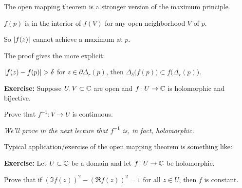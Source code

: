 \documentclass[10pt,aspectratio=169]{beamer}
\begin{document}
\begin{frame}
The open mapping theorem is a stronger version of the maximum
principle.

\medskip
\pause

$f(p)$ is in the interior of $f(V)$ for any open neighborhood $V$ of $p$.

\pause
So $\lvert {f(z)} \rvert$ cannot achieve a maximum at $p$.

\medskip
\pause

The proof gives the more explicit:

\medskip

$\left\lvert {f(z)-f(p)} \right\rvert > \delta$ for $z \in \partial \Delta_r(p)$,
then
$\Delta_{\delta}\bigl(f(p)\bigr) \subset f\bigl(\Delta_r(p)\bigr)$.
\end{frame}

\begin{frame}

\textbf{Exercise:}
Suppose $U,V \subset {\mathbb{C}}$ are open and $f \colon U \to {\mathbb{C}}$ is holomorphic
and bijective.

Prove that $f^{-1} \colon V \to U$ is continuous.

\pause
\emph{We'll prove in the next lecture that $f^{-1}$ is, in fact,
holomorphic.}

\medskip
\pause

Typical application/exercise of the open mapping theorem is something like:

\medskip

\textbf{Exercise:}
Let $U \subset {\mathbb{C}}$ be a domain and let $f \colon U \to {\mathbb{C}}$ be holomorphic.

Prove that if $(\Im f(z))^2 - (\Re f(z))^2 = 1$
for all $z \in U$,
then $f$ is constant.

\end{frame}
\end{document}
